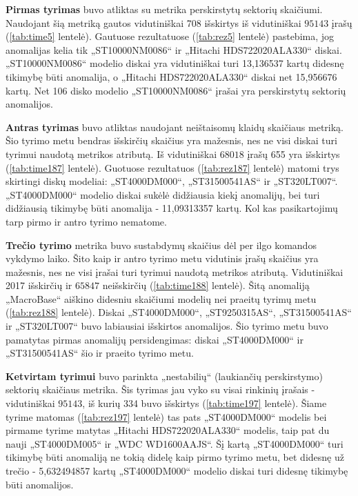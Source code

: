 \documentclass{VUMIFPSkursinis}
\begin{document}
\textbf{Pirmas tyrimas} buvo atliktas su metrika perskirstytų sektorių skaičiumi. Naudojant šią metriką gautos vidutiniškai 708 išskirtys iš vidutiniškai $95 143$ įrašų (\ref{tab:time5} lentelė). Gautuose rezultatuose (\ref{tab:rez5} lentelė) pastebima, jog anomalijas kelia tik „ST10000NM0086“ ir „Hitachi HDS722020ALA330“ diskai. „ST10000NM0086“ modelio diskai yra vidutiniškai turi 13,136537 kartų didesnę tikimybę būti anomalija, o „Hitachi HDS722020ALA330“ diskai net 15,956676 kartų. Net 106 disko modelio „ST10000NM0086“ įrašai yra perskirstytų sektorių anomalijos.\par

\textbf{Antras tyrimas} buvo atliktas naudojant neištaisomų klaidų skaičiaus metriką. Šio tyrimo metu bendras išskirčių skaičius yra mažesnis, nes ne visi diskai turi tyrimui naudotą metrikos atributą. Iš vidutiniškai $68 018$ įrašų 655 yra išskirtys (\ref{tab:time187} lentelė). Guotuose rezultatuos (\ref{tab:rez187} lentelė) matomi trys skirtingi diskų modeliai: „ST4000DM000“, „ST31500541AS“ ir „ST320LT007“. „ST4000DM000“ modelio diskai sukėlė didžiausia kiekį anomalijų, bei turi didžiausią tikimybę būti anomalija - 11,09313357 kartų. Kol kas pasikartojimų tarp pirmo ir antro tyrimo nematome.\par

\textbf{Trečio tyrimo} metrika buvo sustabdymų skaičius dėl per ilgo komandos vykdymo laiko. Šito kaip ir antro tyrimo metu vidutinis įrašų skaičius yra mažesnis, nes ne visi įrašai turi tyrimui naudotą metrikos atributą. Vidutiniškai 2017 išskirčių ir $65 847$ neišskirčių (\ref{tab:time188} lentelė). Šitą anomaliją „MacroBase“ aiškino didesniu skaičiumi modelių nei praeitų tyrimų metu (\ref{tab:rez188} lentelė). Diskai „ST4000DM000“, „ST9250315AS“, „ST31500541AS“ ir „ST320LT007“ buvo labiausiai išskirtos anomalijos. Šio tyrimo metu buvo pamatytas pirmas anomalijų persidengimas: diskai „ST4000DM000“ ir „ST31500541AS“ šio ir praeito tyrimo metu.\par

\textbf{Ketvirtam tyrimui} buvo parinkta „nestabilių“ (laukiančių perskirstymo) sektorių skaičiaus metrika. Šis tyrimas jau vyko su visai rinkinių įrašais - vidutiniškai $95 143$, iš kurių 334 buvo išskirtys (\ref{tab:time197} lentelė). Šiame tyrime matomas (\ref{tab:rez197} lentelė) tas pats „ST4000DM000“ modelis bei pirmame tyrime matytas „Hitachi HDS722020ALA330“ modelis, taip pat du nauji „ST4000DM005“ ir „WDC WD1600AAJS“. Šį kartą „ST4000DM000“ turi tikimybę būti anomaliją ne tokią didelę kaip pirmo tyrimo metu, bet didesnę už trečio - 5,632494857 kartų „ST4000DM000“ modelio diskai turi didesnę tikimybę būti anomalijos.
\end{document}
